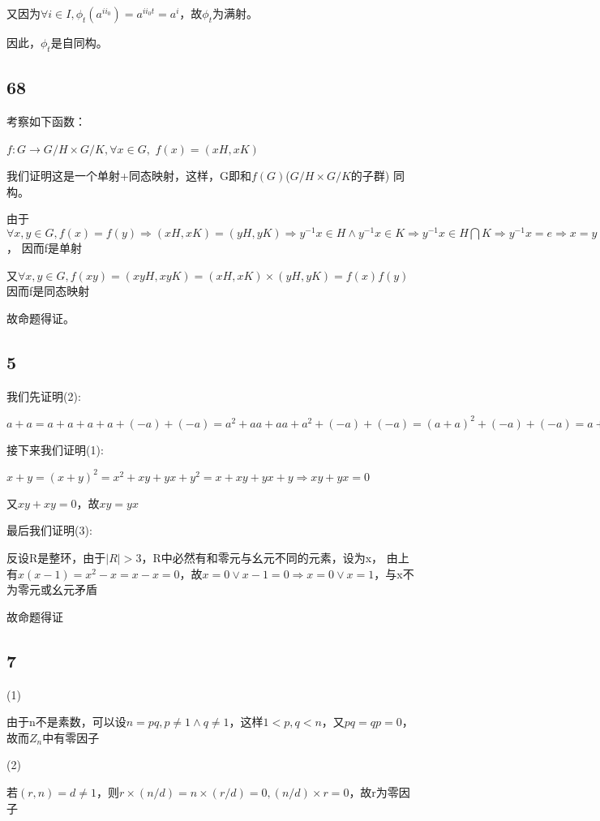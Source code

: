 \documentclass[UTF8]{ctexart}
\begin{document}
又因为$\forall i\in I, \phi_t(a^{ii_0}) = a^{ii_0t} = a^i$，故$\phi_t$为满射。

因此，$\phi_t$是自同构。

\subsection*{68}

考察如下函数：

$f:G\rightarrow G/H\times G/K, \forall x\in G, $
$f(x) = (xH, xK)$

我们证明这是一个单射+同态映射，这样，G即和$f(G)$($G/H\times G/K$的子群)
同构。

由于$\forall x, y\in G, f(x) = f(y)\Rightarrow (xH, xK) = (yH, yK)\Rightarrow y^{-1}x\in H\land y^{-1}x\in K\Rightarrow y^{-1}x\in H\bigcap K\Rightarrow y^{-1}x = e\Rightarrow x = y$，
因而f是单射

又$\forall x, y\in G, f(xy) = (xyH, xyK) = (xH, xK)\times (yH, yK) = f(x)f(y)$
因而f是同态映射

故命题得证。

\subsection*{5}

我们先证明(2):

$a + a = a + a + a + a +(-a) +(-a) = a^2 + aa + aa + a^2 +(-a) +(-a) = (a + a)^2 +(-a) +(-a) = a + a +(-a) +(-a) = 0$

接下来我们证明(1):

$x + y = (x + y)^2 = x^2 + xy + yx + y^2 = x + xy + yx + y\Rightarrow xy + yx = 0$

又$xy + xy = 0$，故$xy = yx$

最后我们证明(3):

反设R是整环，由于$|R| > 3$，R中必然有和零元与幺元不同的元素，设为x，
由上有$x(x - 1) = x^2 - x = x - x = 0$，故$x = 0\lor x - 1 = 0\Rightarrow x = 0\lor x = 1$，与x不为零元或幺元矛盾

故命题得证

\subsection*{7}

(1)

由于n不是素数，可以设$n = pq, p\neq 1\land q\neq 1$，这样$1 < p, q < n$，又$pq = qp = 0$，故而$Z_n$中有零因子

(2)

若$(r, n) = d\neq 1$，则$r\times (n / d) = n\times (r / d) = 0, (n / d)\times r = 0$，故r为零因子
\end{document}
